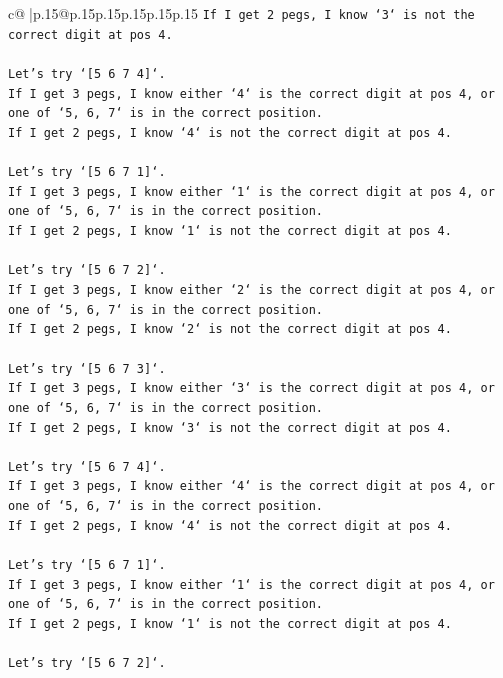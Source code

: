 \documentclass{article}
\begin{document}
{\begin{supertabular}{c@{$\;$}|p{.15\linewidth}@{}p{.15\linewidth}p{.15\linewidth}p{.15\linewidth}p{.15\linewidth}p{.15\linewidth}}
{{{\texttt{If I get 2 pegs, I know `3` is not the correct digit at pos 4.} \\
\\ 
\texttt{Let's try `{[}5 6 7 4{]}`.} \\
\texttt{If I get 3 pegs, I know either `4` is the correct digit at pos 4, or one of `5, 6, 7` is in the correct position.} \\
\texttt{If I get 2 pegs, I know `4` is not the correct digit at pos 4.} \\
\\ 
\texttt{Let's try `{[}5 6 7 1{]}`.} \\
\texttt{If I get 3 pegs, I know either `1` is the correct digit at pos 4, or one of `5, 6, 7` is in the correct position.} \\
\texttt{If I get 2 pegs, I know `1` is not the correct digit at pos 4.} \\
\\ 
\texttt{Let's try `{[}5 6 7 2{]}`.} \\
\texttt{If I get 3 pegs, I know either `2` is the correct digit at pos 4, or one of `5, 6, 7` is in the correct position.} \\
\texttt{If I get 2 pegs, I know `2` is not the correct digit at pos 4.} \\
\\ 
\texttt{Let's try `{[}5 6 7 3{]}`.} \\
\texttt{If I get 3 pegs, I know either `3` is the correct digit at pos 4, or one of `5, 6, 7` is in the correct position.} \\
\texttt{If I get 2 pegs, I know `3` is not the correct digit at pos 4.} \\
\\ 
\texttt{Let's try `{[}5 6 7 4{]}`.} \\
\texttt{If I get 3 pegs, I know either `4` is the correct digit at pos 4, or one of `5, 6, 7` is in the correct position.} \\
\texttt{If I get 2 pegs, I know `4` is not the correct digit at pos 4.} \\
\\ 
\texttt{Let's try `{[}5 6 7 1{]}`.} \\
\texttt{If I get 3 pegs, I know either `1` is the correct digit at pos 4, or one of `5, 6, 7` is in the correct position.} \\
\texttt{If I get 2 pegs, I know `1` is not the correct digit at pos 4.} \\
\\ 
\texttt{Let's try `{[}5 6 7 2{]}`.} \\
}}}
\end{supertabular}}
\end{document}

